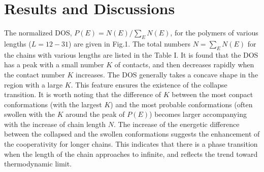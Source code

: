 \documentclass[preprint,preprintnumbers,amsmath,amssymb,showpacs,aps,pre]{revtex4-1}
\begin{document}
\section{Results and Discussions}

The normalized DOS, $P(E)=N(E)/\sum_E N(E)$, for the polymers of various
lengths ($L=12-31$) are given in Fig.1. The total
numbers $N=\sum_E N(E)$ for the chains with various lengths are listed
in the Table I. It is found that the DOS has a peak with a small number $K$ of
contacts, and then decreases rapidly when the contact number $K$ increases.
The DOS generally takes a concave shape in the region with a large $K$. This
feature ensures the existence of the collapse transition. It is worth noting
that the difference of $K$ between the most conpact conformations (with the
largest $K$) and the most probable conformations (often swollen with the $K$
around the peak of $P(E)$) becomes larger accompanying with the increase of
chain length $N$. The increase of the energetic difference between the
collapsed and the swollen conformations suggests the enhancement of the
cooperativity for longer chains. This indicates that there is a phase
transition when the length of the chain approaches to infinite, and reflects
the trend toward thermodynamic limit.
\end{document}

